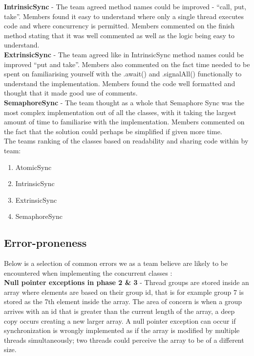 \documentclass[11pt]{article}
\begin{document}
\textbf{IntrinsicSync} - The team agreed method names could be improved - “call, put, take”. Members found it easy to understand where only a single thread executes code and where concurrency is permitted. Members commented on the finish method stating that it was well commented as well as the logic being easy to understand. \\

\textbf{ExtrinsicSync} - The team agreed like in IntrinsicSync method names could be improved “put and take”. Members also commented on the fact time needed to be spent on familiarising yourself with the .await() and .signalAll() functionally to understand the implementation. Members found the code well formatted and thought that it made good use of comments. \\

\textbf{SemaphoreSync} - The team thought as a whole that Semaphore Sync was the most complex implementation out of all the classes, with it taking the largest amount of time to familiarise with the implementation. Members commented on the fact that the solution could perhaps be simplified if given more time.  \\

The teams ranking of the classes based on readability and sharing code within by team: 

\begin{enumerate}
	\item AtomicSync
	\item IntrinsicSync
	\item ExtrinsicSync
	\item SemaphoreSync
\end{enumerate}

\pagebreak
\subsection{Error-proneness}

Below is a selection of common errors we as a team believe are likely to be encountered when implementing the concurrent classes : \\

\textbf{Null pointer exceptions in phase 2 \& 3} - Thread groups are stored inside an array where elements are based on their group id, that is for example group 7 is stored as the 7th element inside the array. The area of concern is  when a group arrives with an id that is greater than the current length of the array, a deep copy occurs creating a new larger array. A null pointer exception can occur if synchronization is wrongly implemented as if the array is modified by multiple threads simultaneously; two threads could perceive the array to be of a different size.\\
\end{document}
